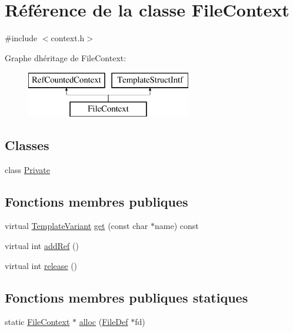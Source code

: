 \hypertarget{class_file_context}{}\section{Référence de la classe File\+Context}
\label{class_file_context}


{\ttfamily \#include $<$context.\+h$>$}

Graphe d\textquotesingle{}héritage de File\+Context\+:\begin{figure}[H]
\begin{center}
\leavevmode
\includegraphics[height=2.000000cm]{class_file_context}
\end{center}
\end{figure}
\subsection*{Classes}
\begin{DoxyCompactItemize}
\item 
class \hyperlink{class_file_context_1_1_private}{Private}
\end{DoxyCompactItemize}
\subsection*{Fonctions membres publiques}
\begin{DoxyCompactItemize}
\item 
virtual \hyperlink{class_template_variant}{Template\+Variant} \hyperlink{class_file_context_ab55e92f170e73c0b1374f38d1d3d09ea}{get} (const char $\ast$name) const 
\item 
virtual int \hyperlink{class_file_context_a4de39e9e60907cd5d245997c45e7f29f}{add\+Ref} ()
\item 
virtual int \hyperlink{class_file_context_a76d76875d88990fae2a58b92e4fd97e0}{release} ()
\end{DoxyCompactItemize}
\subsection*{Fonctions membres publiques statiques}
\begin{DoxyCompactItemize}
\item 
static \hyperlink{class_file_context}{File\+Context} $\ast$ \hyperlink{class_file_context_a71455132aa23fd511eab661fa29255ce}{alloc} (\hyperlink{class_file_def}{File\+Def} $\ast$fd)
\end{DoxyCompactItemize}


